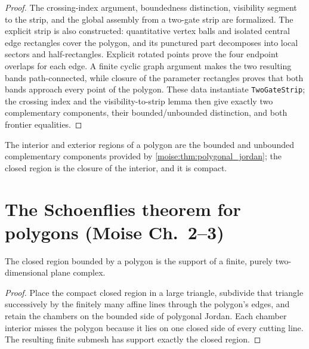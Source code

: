 \begin{proof}
\leanok
The crossing-index argument, boundedness distinction, visibility segment to
the strip, and the global assembly from a two-gate strip are formalized.  The
explicit strip is also constructed: quantitative vertex balls and isolated
central edge rectangles cover the polygon, and its punctured part decomposes
into local sectors and half-rectangles.  Explicit rotated points prove the
four endpoint overlaps for each edge.  A finite cyclic graph argument makes
the two resulting bands path-connected, while closure of the parameter
rectangles proves that both bands approach every point of the polygon.  These
data instantiate \texttt{TwoGateStrip}; the crossing index and the
visibility-to-strip lemma then give exactly two complementary components,
their bounded/unbounded distinction, and both frontier equalities.
\end{proof}

\begin{definition}
\label{moise:def:polygon_regions}
\leanok
{}
The interior and exterior regions of a polygon are the bounded and unbounded
complementary components provided by \ref{moise:thm:polygonal_jordan}; the
closed region is the closure of the interior, and it is compact.
\end{definition}

\section{The Schoenflies theorem for polygons (Moise Ch.~2--3)}

\begin{theorem}
\label{moise:thm:region_polyhedron}
\leanok
{}
The closed region bounded by a polygon is the support of a finite, purely
two-dimensional plane complex.
\end{theorem}

\begin{proof}
\leanok
Place the compact closed region in a large triangle, subdivide that triangle
successively by the finitely many affine lines through the polygon's edges, and
retain the chambers on the bounded side of polygonal Jordan.  Each chamber
interior misses the polygon because it lies on one closed side of every cutting
line.  The resulting finite submesh has support exactly the closed region.
\end{proof}

